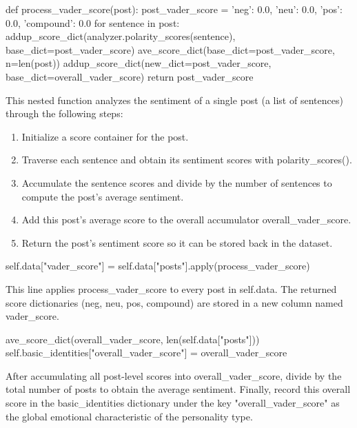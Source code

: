 \documentclass[12pt]{article}
\numberwithin{figure}{section}  %
\begin{document}
	\begin{python}
def process_vader_score(post):
    post_vader_score = {'neg': 0.0, 'neu': 0.0, 'pos': 0.0, 'compound': 0.0}
    for sentence in post:
        addup_score_dict(analyzer.polarity_scores(sentence), base_dict=post_vader_score)
    ave_score_dict(base_dict=post_vader_score, n=len(post))
    addup_score_dict(new_dict=post_vader_score, base_dict=overall_vader_score)
    return post_vader_score
	\end{python}
	This nested function analyzes the sentiment of a single post (a list of
	sentences) through the following steps:
	\begin{enumerate}
	\item Initialize a score container for the post.
	\item Traverse each sentence and obtain its sentiment scores with
	polarity\_scores().
	\item Accumulate the sentence scores and divide by the number of sentences
	to compute the post’s average sentiment.
	\item Add this post’s average score to the overall accumulator
	overall\_vader\_score.
	\item Return the post’s sentiment score so it can be stored back in the
	dataset.
	\end{enumerate}
	\begin{python}
self.data["vader_score"] = self.data["posts"].apply(process_vader_score)
	\end{python}
	This line applies process\_vader\_score to every post in self.data. The
	returned score dictionaries (neg, neu, pos, compound) are stored in a new
	column named vader\_score.
	\begin{python}
ave_score_dict(overall_vader_score, len(self.data["posts"]))
self.basic_identities["overall_vader_score"] = overall_vader_score
	\end{python}
	After accumulating all post-level scores into overall\_vader\_score, divide
	by the total number of posts to obtain the average sentiment. Finally,
	record this overall score in the basic\_identities dictionary under the key
	"overall\_vader\_score" as the global emotional characteristic of the
	personality type.
	
\end{document}
